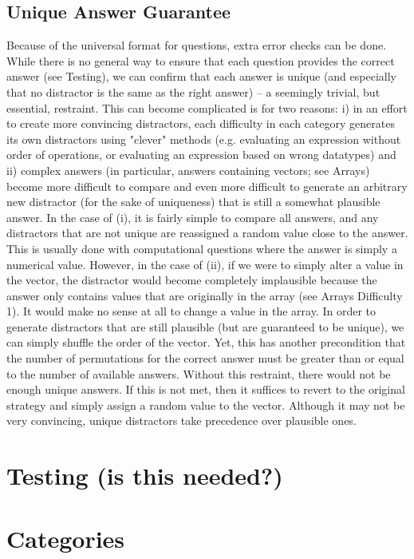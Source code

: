 \documentclass{article}
\begin{document}
\subsection{Unique Answer Guarantee}

Because of the universal format for questions, extra error checks can be done. While there is no general way
to ensure that each question provides the correct answer (see Testing), we can confirm that each answer is unique
(and especially that no distractor is the same as the right answer) -- a seemingly trivial, but essential, restraint.
This can become complicated is for two reasons: i) in an effort to create more convincing distractors,
each difficulty in each category generates its own distractors using "clever" methods (e.g. evaluating an expression
without order of operations, or evaluating an expression based on wrong datatypes) and ii) complex answers
(in particular, answers containing vectors; see Arrays) become more difficult to compare and even more difficult
to generate an arbitrary new distractor (for the sake of uniqueness) that is still a somewhat plausible answer.
In the case of (i), it is fairly simple to compare all answers, and any distractors that are not unique are reassigned
a random value close to the answer. This is usually done with computational questions where the answer is simply a
numerical value. However, in the case of (ii), if we were to simply alter a value in the vector, the distractor would
become completely implausible because the answer only contains values that are originally in the array (see Arrays
Difficulty 1). It would make no sense at all to change a value in the array. In order to generate distractors that
are still plausible (but are guaranteed to be unique), we can simply shuffle the order of the vector. Yet, this has
another precondition that the number of permutations for the correct answer must be greater than or equal to the
number of available answers. Without this restraint, there would not be enough unique answers. If this is not met,
then it suffices to revert to the original strategy and simply assign a random value to the vector. Although it may
not be very convincing, unique distractors take precedence over plausible ones.


\section{Testing (is this needed?)}


\section{Categories}
\end{document}

